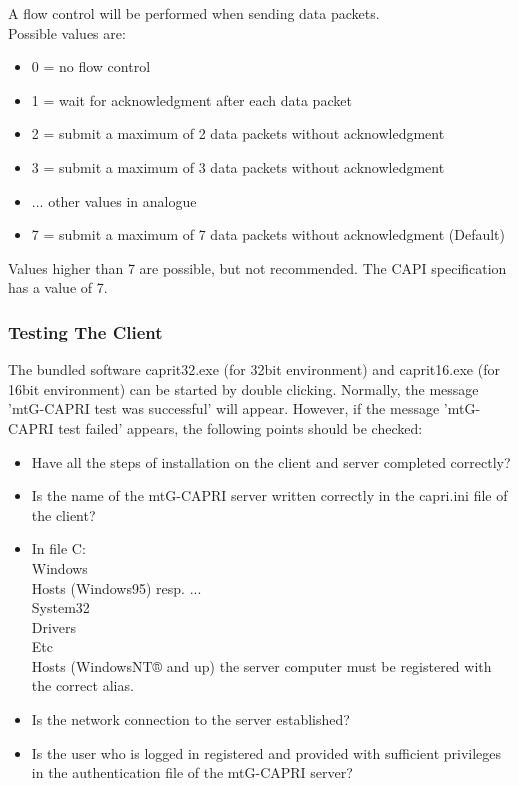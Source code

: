 \begin{description}

    A flow control will be performed when sending data packets.\\
    Possible values are:\\
    \begin{itemize}
        \item 0 = no flow control
        \item 1 = wait for acknowledgment after each data packet
        \item 2 = submit a maximum of 2 data packets without acknowledgment
        \item 3 = submit a maximum of 3 data packets without acknowledgment
        \item ... other values in analogue
        \item 7 = submit a maximum of 7 data packets without acknowledgment (Default)
    \end{itemize}

    Values higher than 7 are possible, but not recommended. The CAPI specification has a value of 7.
\end{description}

\subsubsection{Testing The Client}
    The bundled software caprit32.exe (for 32bit environment) and caprit16.exe
     (for 16bit environment) can be started by double clicking.
     Normally, the message 'mtG-CAPRI test was successful' will appear.
     However, if the message 'mtG-CAPRI test failed' appears, the following points should be checked:
     \begin{itemize}
        \item Have all the steps of installation on the client and server completed correctly?
        \item Is the name of the mtG-CAPRI server written correctly in the capri.ini file of the client?
        \item In file C:\\Windows\\Hosts (Windows95) resp. ...\\System32\\Drivers\\Etc\\Hosts
            (WindowsNT® and up) the server computer must be registered with the correct alias.
        \item Is the network connection to the server established?
        \item Is the user who is logged in registered and provided with sufficient privileges
        in the authentication file of the mtG-CAPRI server?
    \end{itemize}

